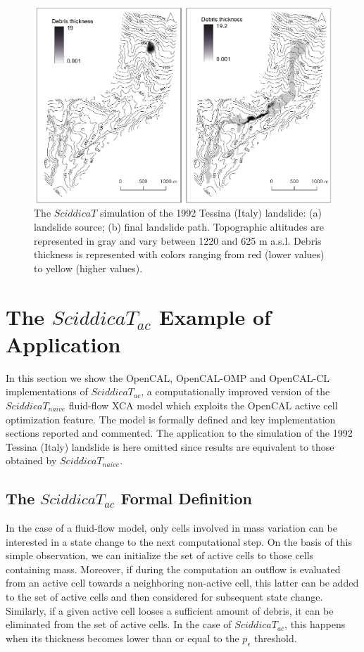 \begin{figure}
	\begin{center}
		\includegraphics[width=1.0\textwidth]{./images/opencal/Figure05_new}
		\caption[The $SciddicaT$ simulation of the 1992 Tessina (Italy) landslide.]{The $SciddicaT$ simulation of the 1992 Tessina (Italy) landslide: (a) landslide source; (b) final landslide path. Topographic altitudes are represented in gray and vary between 1220 and 625 m a.s.l. Debris
		thickness is represented with colors ranging from red (lower values)
		to yellow (higher values).}
		\label{fig:sciddicaT-simulation}
	\end{center}
\end{figure}

\section{The $SciddicaT_{ac}$ Example of Application}
\label{sec:SciddicaT-ac}

In this section we show the OpenCAL, OpenCAL-OMP and OpenCAL-CL
implementations of $SciddicaT_{ac}$, a computationally improved
version of the $SciddicaT_{naive}$ fluid-flow XCA model which
exploits the OpenCAL active cell optimization feature. The model is
formally defined and key implementation sections reported and
commented. The application to the simulation of the 1992 Tessina
(Italy) landslide is here omitted since results are equivalent to
those obtained by $SciddicaT_{naive}$.

\subsection{The $SciddicaT_{ac}$ Formal Definition}
In the case of a fluid-flow model, only cells involved in mass
variation can be interested in a state change to the next
computational step. On the basis of this simple observation, we
can initialize the set of active cells to those cells containing
mass. Moreover, if during the computation an outflow is evaluated
from an active cell towards a neighboring non-active cell, this
latter can be added to the set of active cells and then considered
for subsequent state change. Similarly, if a given active cell
looses a sufficient amount of debris, it can be eliminated from
the set of active cells. In the case of $SciddicaT_{ac}$, this
happens when its thickness becomes lower than or equal to the
$p_\epsilon$ threshold.

